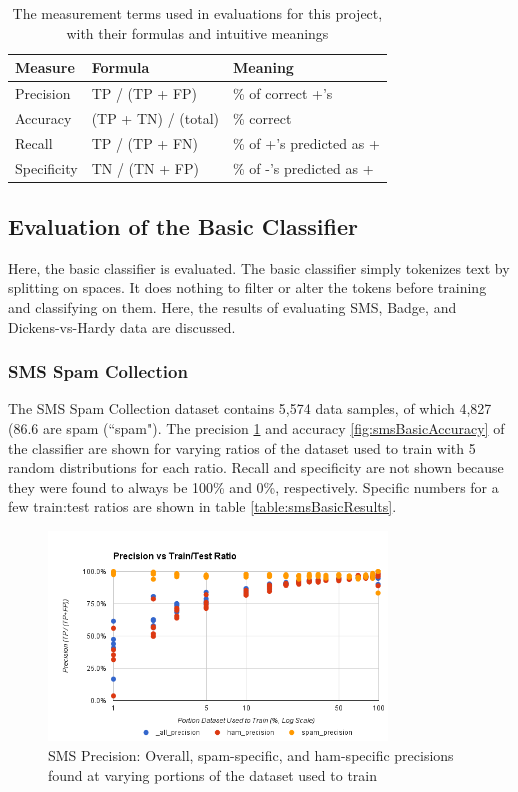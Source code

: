 \begin{table}
    \begin{tabular}{lll}
        \hline
        \textbf{Measure} & \textbf{Formula} & \textbf{Meaning} \\ [0.5ex]
        \hline\hline
        Precision	& TP / (TP + FP) & \% of correct +'s \\
        Accuracy	& (TP + TN) / (total) & \% correct \\
        Recall 	    & TP / (TP + FN) & \% of +'s predicted as + \\
        Specificity	& TN / (TN + FP) & \% of -'s predicted as + \\
        \hline
    \end{tabular}
    \caption{The measurement terms used in evaluations for this project, with their formulas and intuitive meanings}
    \label{table:measures}
\end{table}

\subsection{Evaluation of the Basic Classifier}
\label{subsection:basicResults}
Here, the basic classifier is evaluated. The basic classifier simply tokenizes text by splitting on spaces. It does
nothing to filter or alter the tokens before training and classifying on them. Here, the results of evaluating SMS,
Badge, and Dickens-vs-Hardy data are discussed.

\subsubsection{SMS Spam Collection}
\label{subsection:smsBasic}
The SMS Spam Collection dataset \cite{sms} contains 5,574 data samples, of which 4,827 (86.6%
are spam (``spam"). The precision \ref{fig:smsBasicPrecision} and accuracy \ref{fig:smsBasicAccuracy} of the classifier
are shown for varying ratios of the dataset used to train with 5 random distributions for each ratio. Recall and
specificity are not shown because they were found to always be 100\% and 0\%, respectively. Specific numbers
for a few train:test ratios are shown in table \ref{table:smsBasicResults}.

\begin{figure}[ht!]
    \centering
    \includegraphics[width=90mm]{img/sms_basic-precision.png}
    \caption{SMS Precision: Overall, spam-specific, and ham-specific precisions found at varying portions of the dataset used to train}
    \label{fig:smsBasicPrecision}
\end{figure}

